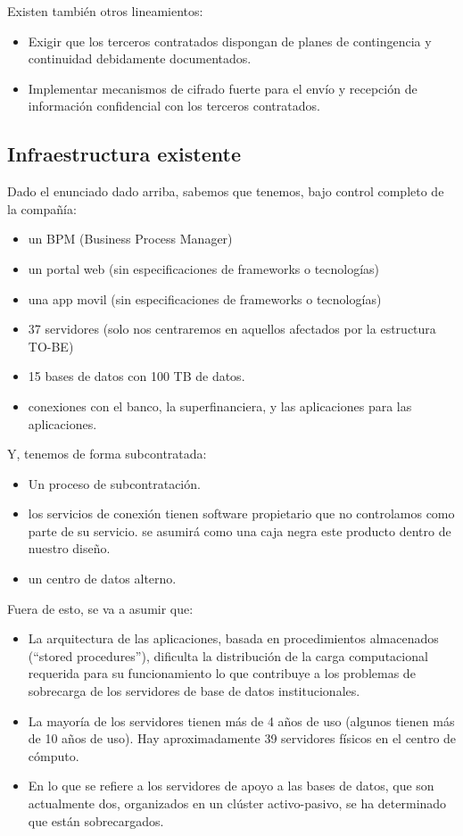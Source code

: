 \documentclass[a4paper]{article}
\begin{document}
Existen también otros lineamientos:
\begin{itemize}
    \item Exigir que los terceros contratados dispongan de planes de contingencia y continuidad debidamente
    documentados.
    \item Implementar mecanismos de cifrado fuerte para el envío y recepción de información confidencial con los
    terceros contratados.
\end{itemize}

\subsection{Infraestructura existente}
Dado el enunciado dado arriba, sabemos que tenemos, bajo control completo de la compañía:
\begin{itemize}
    \item un BPM (Business Process Manager)
    \item un portal web (sin especificaciones de frameworks o tecnologías)
    \item una app movil (sin especificaciones de frameworks o tecnologías)
    \item 37 servidores (solo nos centraremos en aquellos afectados por la estructura TO-BE)
    \item 15 bases de datos con 100 TB de datos.
    \item conexiones con el banco, la superfinanciera, y las aplicaciones para las aplicaciones.
\end{itemize}

Y, tenemos de forma subcontratada:

\begin{itemize}
    \item Un proceso de subcontratación.
    \item los servicios de conexión tienen software propietario que no controlamos como parte de su servicio. 
    se asumirá como una caja negra este producto dentro de nuestro diseño.
    \item un centro de datos alterno. 
\end{itemize}

Fuera de esto, se va a asumir que:

\begin{itemize}
    \item La arquitectura de las aplicaciones, basada en procedimientos almacenados (“stored procedures”), dificulta la
    distribución de la carga computacional requerida para su funcionamiento lo que contribuye a los problemas de
    sobrecarga de los servidores de base de datos institucionales.
    \item La mayoría de los servidores tienen más de 4 años de uso (algunos tienen más de 10 años de uso). Hay
    aproximadamente 39 servidores físicos en el centro de cómputo.
    \item En lo que se refiere a los servidores de apoyo a las bases de datos, que son actualmente dos, organizados en
    un clúster activo-pasivo, se ha determinado que están sobrecargados.
\end{itemize}
\end{document}
